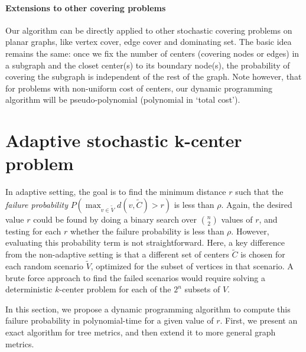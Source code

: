 \documentclass[11pt,onecolumn]{article}
\begin{document}
\paragraph{Extensions to other covering problems}
Our algorithm can be directly applied to other stochastic covering problems on planar graphs, like vertex cover, edge cover and dominating set. The basic idea remains the same: once we fix the number of centers (covering nodes or edges) in a subgraph and the closet center(s) to its boundary node(s), the probability of covering the subgraph is independent of the rest of the graph. Note however, that for problems with non-uniform cost of centers, our dynamic programming algorithm will be pseudo-polynomial (polynomial in `total cost').
\section{Adaptive stochastic k-center problem}
In adaptive setting, the goal is to find the minimum distance $r$ such that the {\it failure probability} $P(\max_{v \in \tilde{V}} d(v,\tilde{C}) > r)$ is less than $\rho$. Again, the desired value $r$ could be found by doing a binary search over ${n \choose 2}$ values of $r$, and testing for each $r$ whether the failure probability is less than $\rho$. 
However, evaluating this probability term is not straightforward. Here, a key difference from the non-adaptive setting is that a different set of centers $\tilde{C}$ is chosen for each random scenario $\tilde{V}$, optimized for the subset of vertices in that scenario. A brute force approach to find the failed scenarios would require solving a deterministic $k$-center problem for each of the $2^n$ subsets of $V$.


In this section, we propose a dynamic programming algorithm to compute this failure probability in polynomial-time for a given value of $r$. 
First, we present an exact algorithm for tree metrics, and then extend it to more general graph metrics.
\end{document}
